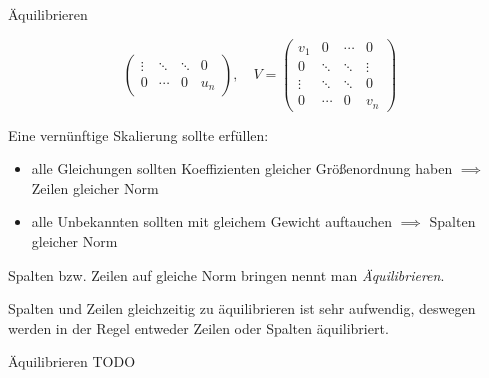 \begin{bonus}{Äquilibrieren}
\begin{itemize}
\[\begin{pmatrix}
                      \vdots & \ddots & \ddots & 0      \\
                      0      & \cdots & 0      & u_n
                  \end{pmatrix},
                  \quad V =
                  \begin{pmatrix}
                      v_1    & 0      & \cdots & 0      \\
                      0      & \ddots & \ddots & \vdots \\
                      \vdots & \ddots & \ddots & 0      \\
                      0      & \cdots & 0      & v_n
                  \end{pmatrix}
              \]
    \end{itemize}

    Eine vernünftige Skalierung sollte erfüllen:
    \begin{itemize}
        \item alle Gleichungen sollten Koeffizienten gleicher Größenordnung haben $\implies$ Zeilen gleicher Norm
        \item alle Unbekannten sollten mit gleichem Gewicht auftauchen $\implies$ Spalten gleicher Norm
    \end{itemize}

    Spalten bzw. Zeilen auf gleiche Norm bringen nennt man \emph{Äquilibrieren}.

    Spalten und Zeilen gleichzeitig zu äquilibrieren ist sehr aufwendig, deswegen werden in der Regel entweder Zeilen oder Spalten äquilibriert.
\end{bonus}

\begin{example}{Äquilibrieren}
    TODO
\end{example}

